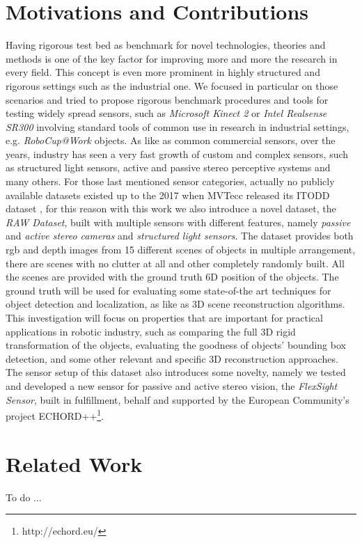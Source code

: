 \section{Motivations and Contributions}\label{sec:motivations}
Having rigorous test bed as benchmark for novel technologies, theories and methods is one of the key factor for improving more and more the research in every field. This concept is even more prominent in highly structured and rigorous settings such as the industrial one. We focused in particular on those scenarios and tried to propose rigorous benchmark procedures and tools for testing widely spread sensors, such as \emph{Microsoft Kinect 2} or \emph{Intel Realsense SR300} involving standard tools of common use in research in industrial settings, e.g. \emph{RoboCup@Work} objects. As like as common commercial sensors, over the years, industry has seen a very fast growth of custom and complex sensors, such as structured light sensors, active and passive stereo perceptive systems and many others. For those last mentioned sensor categories, actually no publicly available datasets existed up to the 2017 when MVTecc released its ITODD dataset \cite{mvtec2017itodd}, for this reason with this work we also introduce a novel dataset, the \emph{RAW Dataset}, built with multiple sensors with different features, namely \emph{passive} and \emph{active stereo cameras} and \emph{structured light sensors}. The dataset provides both rgb and depth images from 15 different scenes of objects in multiple arrangement, there are scenes with no clutter at all and other completely randomly built. All the scenes are provided with the ground truth 6D position of the objects. The ground truth will be used for evaluating some state-of-the art techniques for object detection and localization, as like as 3D scene reconstruction algorithms. This investigation will focus on properties that are important for practical applications in robotic industry, such as comparing the full 3D rigid transformation of the objects, evaluating the goodness of objects' bounding box detection, and some other relevant and specific 3D reconstruction approaches. The sensor setup of this dataset also introduces some novelty, namely we tested and developed a new sensor for passive and active stereo vision, the \emph{FlexSight Sensor}, built in fulfillment, behalf and supported by the European Community's project ECHORD++\footnote{http://echord.eu/}.

\section{Related Work}\label{sec:relatedwork}
To do ...

